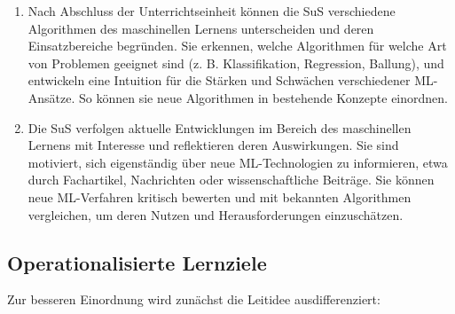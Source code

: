 \documentclass[twocolumn]{article}
\begin{document}
\begin{enumerate}[itemsep=0.3em, parsep=0pt, topsep=0em]
    \item Nach Abschluss der Unterrichtseinheit können die SuS verschiedene Algorithmen des maschinellen Lernens unterscheiden und deren Einsatzbereiche begründen. Sie erkennen, welche Algorithmen für welche Art von Problemen geeignet sind (z. B. Klassifikation, Regression, Ballung), und entwickeln eine Intuition für die Stärken und Schwächen verschiedener ML-Ansätze. So können sie neue Algorithmen in bestehende Konzepte einordnen.

    \item Die SuS verfolgen aktuelle Entwicklungen im Bereich des maschinellen Lernens mit Interesse und reflektieren deren Auswirkungen. Sie sind motiviert, sich eigenständig über neue ML-Technologien zu informieren, etwa durch Fachartikel, Nachrichten oder wissenschaftliche Beiträge.
    Sie können neue ML-Verfahren kritisch bewerten und mit bekannten Algorithmen vergleichen, um deren Nutzen und Herausforderungen einzuschätzen.
\end{enumerate}

\subsection{Operationalisierte Lernziele}
\label{sec:oplernziele}

Zur besseren Einordnung wird zunächst die Leitidee ausdifferenziert:
\end{document}

